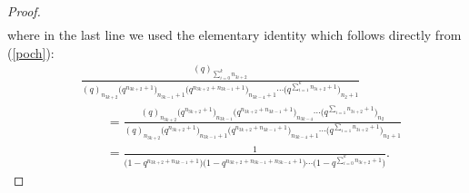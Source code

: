 \documentclass[pdftex]{sigma}
\numberwithin{equation}{section}
\theoremstyle{definition}
\begin{document}
\begin{proof}
\begin{align*}
\end{align*}
where in the last line we used the elementary identity which follows directly from (\ref{poch}):
\begin{align*}
& \frac{(q)_{\sum_{i=0}^k n_{3i+2}}}{(q)_{n_{3k+2}}\bigl(q^{n_{3k+2}+1}\bigr)_{n_{3k-1}+1} \bigl(q^{n_{3k+2}+n_{3k-1}+1}\bigr)_{n_{3k-4}+1} \cdots \bigl(q^{\sum_{i=1}^k n_{3i+2}+1}\bigr)_{n_2+1}} \\
& \qquad =\frac{(q)_{n_{3k+2}}\bigl(q^{n_{3k+2}+1}\bigr)_{n_{3k-1}} \bigl(q^{n_{3k+2}+n_{3k-1}+1}\bigr)_{n_{3k-4}} \cdots \bigl(q^{\sum_{i=1} n_{3i+2}+1}\bigr)_{n_2}}{(q)_{n_{3k+2}}\bigl(q^{n_{3k+2}+1}\bigr)_{n_{3k-1}+1} \bigl(q^{n_{3k+2}+n_{3k-1}+1}\bigr)_{n_{3k-4}+1} \cdots \bigl(q^{\sum_{i=1} n_{3i+2}+1}\bigr)_{n_2+1}} \\
& \qquad =\frac{1}{\bigl(1-q^{n_{3k+2}+n_{3k-1}+1}\bigr) \bigl(1-q^{n_{3k+2}+n_{3k-1}+n_{3k-4}+1}\bigr) \cdots \bigl(1-q^{\sum_{i=0}^k n_{3i+2}+1}\bigr)}.\tag*{\qed}
\end{align*}\renewcommand{\qed}{}
\end{proof}
\end{document}
